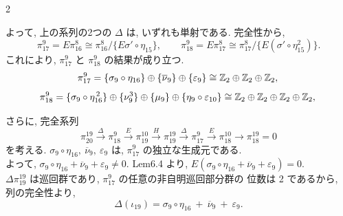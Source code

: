 \documentclass[10pt, leqno]{ltjsarticle}
\newcommand{\ov}[1]{\overline{#1}}
\newcommand{\gen}[1]{\{#1\}}       %
\newcommand{\pit}[2]{\pi_{#1}^{#2}}
\numberwithin{equation}{section}
\theoremstyle{plain}
\theoremstyle{definition}
\theoremstyle{remark}
\begin{document}
\begin{paracol}{2}

\noindent
よって, 上の系列の2つの \(\Delta\) は, 
いずれも単射である.
完全性から,
\[
\pit{17}{9}=E\pit{16}{8}
\cong \pit{16}{8}\big/\gen{E\sigma'\circ\eta_{15}},
\qquad
\pit{18}{9}=E\pit{17}{8}
\cong \pit{17}{8}\big/\gen{E(\sigma'\circ\eta_{15}^{2})}.
\]
これにより, \(\pit{17}{9}\) と \(\pit{18}{9}\) の結果が成り立つ. 
\[
\pit{17}{9}=
\gen{\sigma_{9}\circ\eta_{16}}\oplus\gen{\ov{\nu}_{9}}\oplus\gen{\varepsilon_{9}}
\cong \mathbb Z_{2}\oplus\mathbb Z_{2}\oplus\mathbb Z_{2},\\
\]
\[
\pit{18}{9}=
\gen{\sigma_{9}\circ\eta_{16}^{\,2}}\oplus\gen{\nu_{9}^{3}}\oplus
\gen{\mu_{9}}\oplus\gen{\eta_{9}\circ\varepsilon_{10}}
\cong\mathbb Z_{2}\oplus\mathbb Z_{2}\oplus\mathbb Z_{2}\oplus\mathbb Z_{2},\\
\]

\medskip
\noindent
さらに, 完全系列
\[
\pit{20}{19}\xrightarrow{\ \Delta\ }\pit{18}{9}\xrightarrow{\ E\ }\pit{19}{10}
\xrightarrow{\ H\ }\pit{19}{19}\xrightarrow{\ \Delta\ }\pit{17}{9}
\xrightarrow{E}\pit{18}{10}\xrightarrow{}\pit{18}{19}= 0
\]
を考える. 
\(\sigma_{9}\circ\eta_{16},\ \ov{\nu}_{9},\ \varepsilon_{9}\) は, 
\(\pit{17}{9}\) の独立な生成元である. \\
よって, \(\sigma_{9}\circ\eta_{16}+\ov{\nu}_{9}+\varepsilon_{9}\ne0\).
Lem6.4 より, \(E(\sigma_{9}\circ\eta_{16}+\ov{\nu}_{9}+\varepsilon_{9})=0\).\\
\(\Delta\pit{19}{19}\) は巡回群であり, \(\pit{17}{9}\) の任意の非自明巡回部分群の
位数は 2 であるから,\\
列の完全性より,
\begin{equation}
\Delta(\iota_{19})=\sigma_{9}\circ\eta_{16}\ +\ \ov{\nu}_{9}\ +\ \varepsilon_{9}.
\end{equation}



\end{paracol}
\end{document}
